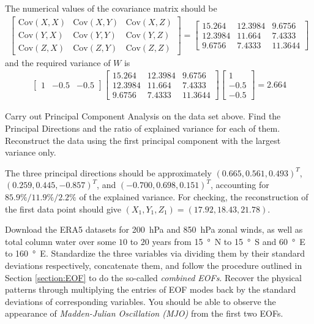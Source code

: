 \begin{Answer}
The numerical values of the covariance matrix should be
\begin{align*}
\begin{bmatrix}
\text{Cov}(X,X) & \text{Cov}(X,Y) & \text{Cov}(X,Z) \\
\text{Cov}(Y,X) & \text{Cov}(Y,Y) & \text{Cov}(Y,Z) \\
\text{Cov}(Z,X) & \text{Cov}(Z,Y) & \text{Cov}(Z,Z)
\end{bmatrix}
=
\begin{bmatrix}
15.264 & 12.3984 & 9.6756 \\
12.3984 & 11.664 & 7.4333 \\
9.6756 & 7.4333 & 11.3644
\end{bmatrix}
\end{align*}
and the required variance of $W$ is
\begin{align*}
\begin{bmatrix}
1 & -0.5 & -0.5
\end{bmatrix}
\begin{bmatrix}
15.264 & 12.3984 & 9.6756 \\
12.3984 & 11.664 & 7.4333 \\
9.6756 & 7.4333 & 11.3644
\end{bmatrix}
\begin{bmatrix}
1 \\
-0.5 \\
-0.5
\end{bmatrix} = 2.664
\end{align*}
\end{Answer}

\begin{Exercise}
Carry out Principal Component Analysis on the data set above. Find the Principal Directions and the ratio of explained variance for each of them. Reconstruct the data using the first principal component with the largest variance only.
\end{Exercise}
\begin{Answer}
The three principal directions should be approximately $(0.665, \allowbreak 0.561, 0.493)^T$, $(0.259, 0.445, -0.857)^T$, and $(-0.700, 0.698, 0.151)^T$, accounting for $85.9\%/11.9\%/2.2\%$ of the explained variance. For checking, the reconstruction of the first data point should give $(X_1, Y_1, Z_1) = (17.92, 18.43, 21.78)$.
\end{Answer}

\begin{Exercise}
\label{ex:MJO}
Download the ERA5 datasets for \SI{200}{hPa} and \SI{850}{hPa} zonal winds, as well as total column water over some $10$ to $20$ years from \SI{15}{\degree N} to \SI{15}{\degree S} and \SI{60}{\degree E} to \SI{160}{\degree E}. Standardize the three variables via dividing them by their standard deviations respectively, concatenate them, and follow the procedure outlined in Section \ref{section:EOF} to do the so-called \textit{combined EOFs}. Recover the physical patterns through multiplying the entries of EOF modes back by the standard deviations of corresponding variables. You should be able to observe the appearance of \textit{Madden-Julian Oscillation (MJO)} from the first two EOFs. 
\end{Exercise}

